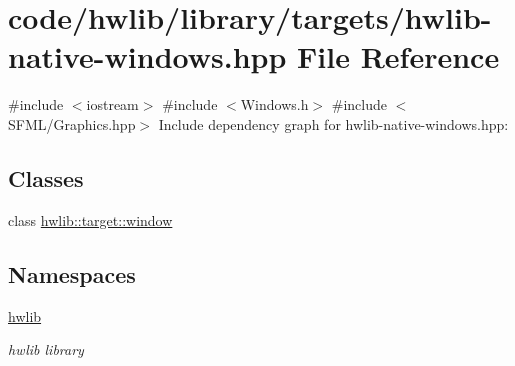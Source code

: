 \hypertarget{hwlib-native-windows_8hpp}{}\section{code/hwlib/library/targets/hwlib-\/native-\/windows.hpp File Reference}
\label{hwlib-native-windows_8hpp}
{\ttfamily \#include $<$iostream$>$}\newline
{\ttfamily \#include $<$Windows.\+h$>$}\newline
{\ttfamily \#include $<$S\+F\+M\+L/\+Graphics.\+hpp$>$}\newline
Include dependency graph for hwlib-\/native-\/windows.hpp\+:
\subsection*{Classes}
\begin{DoxyCompactItemize}
\item 
class \hyperlink{classhwlib_1_1target_1_1window}{hwlib\+::target\+::window}
\end{DoxyCompactItemize}
\subsection*{Namespaces}
\begin{DoxyCompactItemize}
\item 
 \hyperlink{namespacehwlib}{hwlib}
\begin{DoxyCompactList}\small\item\em hwlib library \end{DoxyCompactList}\end{DoxyCompactItemize}
